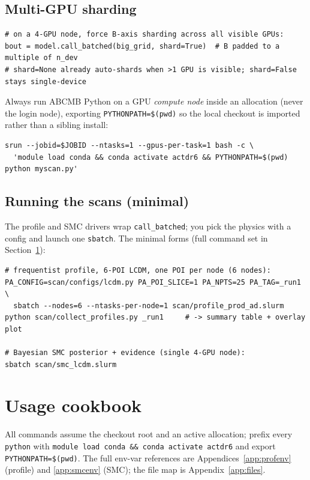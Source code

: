 \documentclass[11pt]{article}
\newcommand{\code}[1]{\texttt{\small #1}}
\begin{document}
\subsection{Multi-GPU sharding}
\begin{lstlisting}
# on a 4-GPU node, force B-axis sharding across all visible GPUs:
bout = model.call_batched(big_grid, shard=True)  # B padded to a multiple of n_dev
# shard=None already auto-shards when >1 GPU is visible; shard=False stays single-device
\end{lstlisting}
Always run \textsc{ABCMB} Python on a GPU \emph{compute node} inside an
allocation (never the login node), exporting \code{PYTHONPATH=\$(pwd)} so the
local checkout is imported rather than a sibling install:
\begin{lstlisting}
srun --jobid=$JOBID --ntasks=1 --gpus-per-task=1 bash -c \
  'module load conda && conda activate actdr6 && PYTHONPATH=$(pwd) python myscan.py'
\end{lstlisting}

\subsection{Running the scans (minimal)}
The profile and SMC drivers wrap \code{call\_batched}; you pick the physics
with a config and launch one \code{sbatch}. The minimal forms (full command
set in Section~\ref{sec:usage}):
\begin{lstlisting}
# frequentist profile, 6-POI LCDM, one POI per node (6 nodes):
PA_CONFIG=scan/configs/lcdm.py PA_POI_SLICE=1 PA_NPTS=25 PA_TAG=_run1 \
  sbatch --nodes=6 --ntasks-per-node=1 scan/profile_prod_ad.slurm
python scan/collect_profiles.py _run1     # -> summary table + overlay plot

# Bayesian SMC posterior + evidence (single 4-GPU node):
sbatch scan/smc_lcdm.slurm
\end{lstlisting}

\section{Usage cookbook}
\label{sec:usage}

All commands assume the checkout root and an active allocation; prefix
every \code{python} with \code{module load conda \&\& conda activate
actdr6} and export \code{PYTHONPATH=\$(pwd)}. The full env-var references
are Appendices~\ref{app:profenv} (profile) and \ref{app:smcenv} (SMC);
the file map is Appendix~\ref{app:files}.
\end{document}
